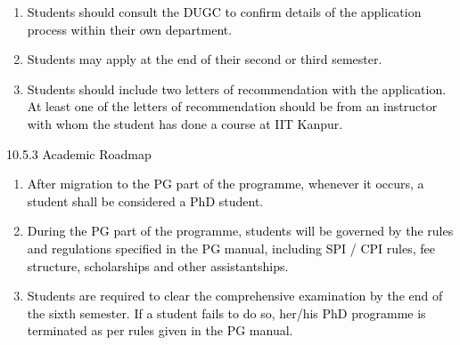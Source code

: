 \documentclass[12pt]{article}
\begin{document}
\vspace{\baselineskip}
\begin{enumerate}
	\item {\fontsize{10pt}{12.0pt}\selectfont \textcolor[HTML]{00000A}{Students should consult the DUGC to confirm details of the application process within their own department.}\par}\par


\vspace{\baselineskip}
	\item {\fontsize{10pt}{12.0pt}\selectfont \textcolor[HTML]{00000A}{Students may apply at the end of their second or third semester.}\par}\par


\vspace{\baselineskip}
	\item {\fontsize{9pt}{10.8pt}\selectfont \textcolor[HTML]{00000A}{Students should include two letters of recommendation with the application. At least one of the letters of recommendation should be from an instructor with whom the student has done a course at IIT Kanpur.}\par}
\end{enumerate}\par


\vspace{\baselineskip}
{\fontsize{10pt}{12.0pt}\selectfont \textcolor[HTML]{00000A}{10.5.3 Academic Roadmap}\par}\par


\vspace{\baselineskip}
\begin{enumerate}
	\item {\fontsize{9pt}{10.8pt}\selectfont \textcolor[HTML]{00000A}{After migration to the PG part of the programme, whenever it occurs, a student shall be considered a PhD student.}\par}\par


\vspace{\baselineskip}
	\item {\fontsize{10pt}{12.0pt}\selectfont \textcolor[HTML]{00000A}{During the PG part of the programme, students will be governed by the rules and regulations specified in the PG manual, including SPI / CPI rules, fee structure, scholarships and other assistantships.}\par}\par


\vspace{\baselineskip}
	\item {\fontsize{10pt}{12.0pt}\selectfont \textcolor[HTML]{00000A}{Students are required to clear the comprehensive examination by the end of the sixth semester. If a student fails to do so, her/his PhD programme is terminated as per rules given in the PG manual.}\par}
\end{enumerate}\par
\end{document}
